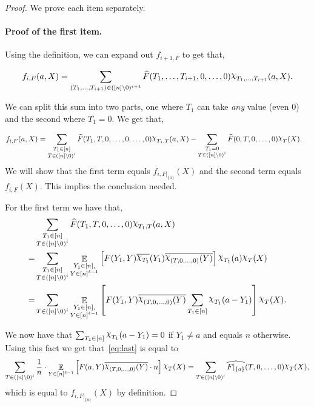 \documentclass[11pt]{article}
\DeclareMathOperator*{\E}{\mathbb{E}}
\def \Chi {\raisebox{2pt}{$\chi$}}
\renewcommand{\hat}[1]{\widehat{#1}}
\theoremstyle{definition}
\begin{document}
\begin{proof}
We prove each item separately.
\paragraph{Proof of the first item.}
Using the definition, we can expand out $f_{i+1,F}$ to get that,

\[f_{i,F}(a, X) = \sum_{(T_1,\ldots,T_{i+1}) \in ([n] \setminus 0)^{i+1}}\hat{F}(T_1,\ldots,T_{i+1},0,\ldots, 0)\Chi_{T_1,\ldots,T_{i+1}}(a, X).\]

We can split this sum into two parts, one where $T_{1}$ can take \emph{any} value (even $0$) and the 
second where $T_{1} = 0$. We get that,

\begin{align*}
f_{i,F}(a,X) &= \sum_{ \substack{T_1 \in [n] \\ T \in ([n] \setminus 0)^i}}\hat{F}(T_1,T, 0,\ldots,0,\ldots, 0)\Chi_{T_1,T}(a,X) 
- \sum_{ \substack{T_1 = 0 \\ T \in ([n] \setminus 0)^i}}\hat{F}(0, T ,0,\ldots, 0)\Chi_{T}(X).
\end{align*}
We will show that the first term equals $f_{i, F|_{\{a\}}}(X)$ and the second term equals $f_{i,F}(X)$. This implies the conclusion needed.

For the first term we have that, 
\begin{align}
&\sum_{ \substack{T_1 \in [n] \\ T \in ([n] \setminus 0)^i}}\hat{F}(T_1, T,0,\ldots,0)\Chi_{T_1,T}(a, X) \nonumber \\
= &\sum_{ \substack{T_1 \in [n] \\ T \in ([n] \setminus 0)^i}} \E_{\substack{Y_1 \in [n], \\ Y \in [n]^{\ell - 1}}}\left[F(Y_1,Y)\overline{\Chi_{T_1}}(Y_1)\overline{\Chi_{(T,0,\ldots,0)}(Y)}\right]\Chi_{T_1}(a)\Chi_{T}(X) \nonumber \\
= &\sum_{T \in ([n] \setminus 0)^i} \E_{\substack{Y_1 \in [n], \\ Y \in [n]^{\ell - 1}}}\left[F(Y_1,Y)\overline{\Chi_{(T,0,\ldots,0)}(Y)}\sum_{T_1 \in [n]}\Chi_{T_1}(a-Y_1)\right]\Chi_{T}(X). \label{eq:last}
\end{align}

We now have that $\sum_{T_1 \in [n]}\Chi_{T_1}(a-Y_1) = 0$ if $Y_1 \neq a$ and equals $n$ otherwise. Using this fact we get that~\eqref{eq:last} is equal to
\begin{align*}
\sum_{T \in ([n] \setminus 0)^i} \frac{1}{n} \cdot \E_{Y \in [n]^{\ell - 1}}\left[F(a,Y)\overline{\Chi_{(T,0,\ldots,0)}(Y)}\cdot n\right]\Chi_{T}(X) 
= \sum_{T \in ([n] \setminus 0)^i} \widehat{F|_{\{a\}}}(T,0,\ldots,0)\Chi_{T}(X),
\end{align*}
which is equal to $f_{i, F|_{\{a\}}}(X)$ by definition.



\end{proof}
\end{document}
